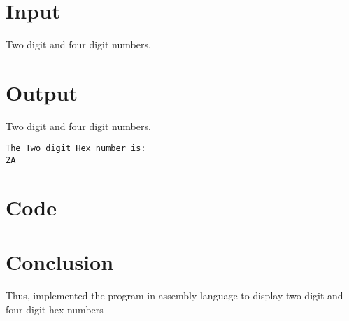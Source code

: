 \documentclass[11pt]{article}
\begin{document}
\section{\textbf{Input}}
Two digit and four digit numbers.

\section{\textbf{Output}}
Two digit and four digit numbers.
\begin{verbatim}
The Two digit Hex number is: 
2A
\end{verbatim}
\section{Code}


\section{\textbf{Conclusion}}
Thus, implemented the program in assembly language to display two digit and four-digit hex numbers
\end{document}
